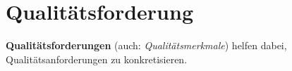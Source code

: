 \section{Qualitätsforderung}

\vspace{2mm}
\begin{tcolorbox}[title=Qualitätsforderung/Qualitätsanforderung]
    \textbf{Qualitätsforderungen} (auch: \textit{Qualitätsmerkmale}) helfen dabei, Qualitätsanforderungen zu konkretisieren.
\end{tcolorbox}
